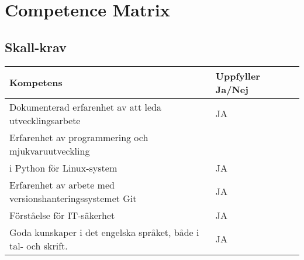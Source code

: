 \section{Competence Matrix}
\subsection{Skall-krav}
    \centering
    \begin{tabular}{p{0.7\linewidth} | p{0.3\linewidth} } 
        Kompetens & Uppfyller Ja/Nej
        \\ \hline
        Dokumenterad erfarenhet av att leda utvecklingsarbete
        &
        JA
        \\ \hline
        Erfarenhet av programmering och mjukvaruutveckling \\
        i Python för Linux-system
        &
        JA
        \\ \hline
         Erfarenhet av arbete med versionshanteringssystemet Git
        &
        JA
        \\ \hline
        Förståelse för IT-säkerhet
        &
        JA
        \\ \hline
        Goda kunskaper i det engelska språket, både i tal- och skrift.
        &
        JA
         \\ \hline
    \end{tabular}
    \label{tab:my_label}

